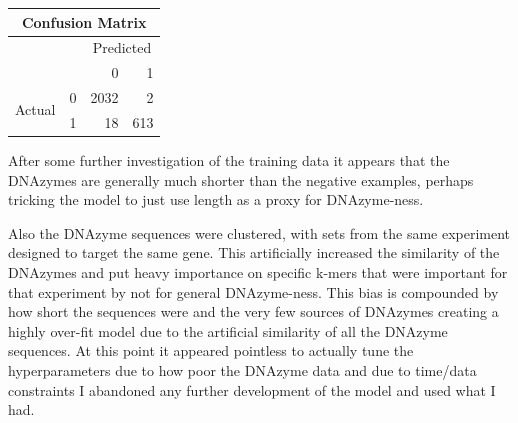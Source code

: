 \documentclass[11pt]{article}
\begin{document}
\begin{center} \begin{tabular}{rrrr}
               \multicolumn{4}{c}{Confusion Matrix}\\
               \hline
                  && \multicolumn{2}{c}{Predicted} \\
                           &          &    0 &   1 \\
\multirow{2}{*}{Actual}    &0         & 2032 &   2 \\
                           &1         &   18 & 613
\end{tabular}\end{center}
After some further investigation of the training data it appears that the DNAzymes are generally much shorter than the negative examples, perhaps tricking the model to just use length as a proxy for DNAzyme-ness.
\begin{figure}[htb!]
\end{figure}
Also the DNAzyme sequences were clustered, with sets from the same experiment designed to target the same gene.
This artificially increased the similarity of the DNAzymes and put heavy importance on specific k-mers that were important for that experiment by not for general DNAzyme-ness.
This bias is compounded by how short the sequences were and the very few sources of DNAzymes creating a highly over-fit model due to the artificial similarity of all the DNAzyme sequences.
At this point it appeared pointless to actually tune the hyperparameters due to how poor the DNAzyme data and due to time/data constraints I abandoned any further development of the model and used what I had.
\end{document}
